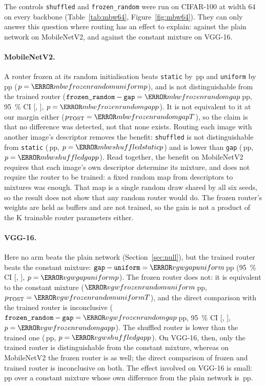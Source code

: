 \documentclass[10pt,a4paper]{article}
\begin{document}
The controls \texttt{shuffled} and \texttt{frozen\_random} were run on
CIFAR-100 at width 64 on every backbone (Table~\ref{tab:mbw64},
Figure~\ref{fig:mbw64}). They can only answer this question where routing
has an effect to explain: against the plain network on MobileNetV2, and
against the constant mixture on VGG-16.

\paragraph{MobileNetV2.} A router frozen at its random initialisation
beats \texttt{static} by \,pp and \texttt{uniform}
by \,pp ($p=\V{mbwfrozenrandomuniformp}$), and is
not distinguishable from the trained router
($\texttt{frozen\_random}-\texttt{gap}=\V{mbwfrozenrandomgap}$\,pp,
\SI{95}{\percent} CI [, ],
$p=\V{mbwfrozenrandomgapp}$). It is not equivalent to it at our margin
either ($p_{\text{TOST}}=\V{mbwfrozenrandomgapT}$), so the claim is that no
difference was detected, not that none exists. Routing each image with
another image's descriptor removes the benefit: \texttt{shuffled} is not
distinguishable from \texttt{static} (\,pp,
$p=\V{mbwshuffledstaticp}$) and is lower than \texttt{gap}
(\,pp, $p=\V{mbwshuffledgapp}$). Read together, the
benefit on MobileNetV2 requires that each image's own descriptor determine
its mixture, and does not require the router to be trained: a fixed random
map from descriptors to mixtures was enough. That map is a single random
draw shared by all six seeds, so the result does not show that any random
router would do. The frozen router's weights are
held as buffers and are not trained, so the gain is not a product of the
K trainable router parameters either.

\paragraph{VGG-16.} Here no arm beats the plain network
(Section~\ref{sec:null}), but the trained router beats the constant
mixture: $\texttt{gap}-\texttt{uniform}=\V{vgwgapuniform}$\,pp
(\SI{95}{\percent} CI [, ],
$p=\V{vgwgapuniformp}$). The frozen router does not: it is equivalent to
the constant mixture ($\V{vgwfrozenrandomuniform}$\,pp,
$p_{\text{TOST}}=\V{vgwfrozenrandomuniformT}$), and the direct comparison
with the trained router is inconclusive
($\texttt{frozen\_random}-\texttt{gap}=\V{vgwfrozenrandomgap}$\,pp,
\SI{95}{\percent} CI [,
], $p=\V{vgwfrozenrandomgapp}$). The shuffled
router is lower than the trained one (\,pp,
$p=\V{vgwshuffledgapp}$). On VGG-16, then, only the trained router is
distinguishable from the constant mixture, whereas on MobileNetV2 the
frozen router is as well; the direct comparison of frozen and trained
router is inconclusive on both. The effect involved on VGG-16 is small: \,pp over a constant
mixture whose own difference from the plain network is \,pp.
\end{document}
